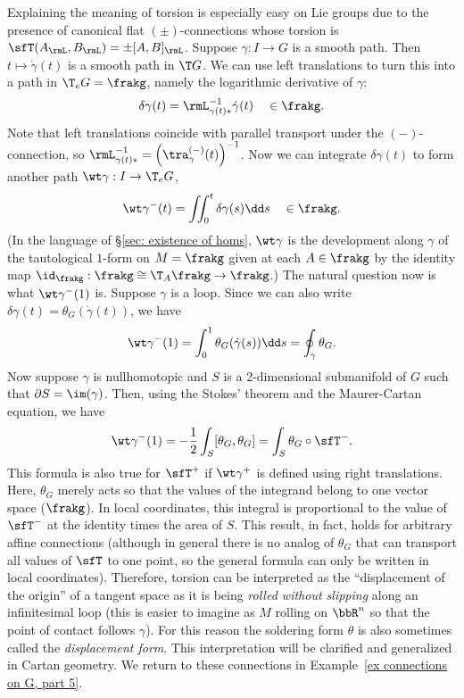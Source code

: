 \begin{example}
    Explaining the meaning of torsion is especially easy on Lie groups due to the presence of canonical flat $(\pm)$-connections whose torsion is $\sfT(A_\rmL,B_\rmL)=\pm [A,B]_\rmL$. Suppose $\gamma:I\to G$ is a smooth path. Then $t\mapsto \dot\gamma(t)$ is a smooth path in $\T G$. We can use left translations to turn this into a path in $\T_e G=\frakg$, namely the logarithmic derivative of $\gamma$:
    \[\delta \gamma(t)=\rmL_{\gamma(t)\ast}^{-1}\dot\gamma(t)\quad \in \frakg.\]
    Note that left translations coincide with parallel transport under the $(-)$-connection, so $\rmL_{\gamma(t)\ast}^{-1}=\left(\tra^{(-)}_{\gamma}(t)\right)^{-1}$. Now we can integrate $\delta\gamma(t)$ to form another path $\wt\gamma:I\to \T_e G$,
    \[\wt\gamma^-(t)=\iint_0^t \delta\gamma(s)\dd s \quad \in \frakg.\]
    (In the language of \S\ref{sec: existence of homs}, $\wt\gamma$ is the development along $\gamma$ of the tautological $1$-form on $M=\frakg$ given at each $A\in\frakg$ by the identity map $\id_{\frakg}:\frakg\cong \T_A\frakg\to \frakg$.) The natural question now is what $\wt\gamma^-(1)$ is. Suppose $\gamma$ is a loop. Since we can also write $\delta\gamma(t)=\theta_G(\dot\gamma(t))$, we have
    \[\wt\gamma^-(1)=\int_0^1 \theta_G(\dot\gamma(s))\dd s=\oint_\gamma \theta_G.\]
    Now suppose $\gamma$ is nullhomotopic and $S$ is a 2-dimensional submanifold of $G$ such that $\partial S=\im(\gamma)$. Then, using the Stokes' theorem and the Maurer-Cartan equation, we have
    \[\wt\gamma^-(1)=-\frac12\int_S [\theta_G,\theta_G]=\int_S \theta_G\circ \sfT^-.\]
    This formula is also true for $\sfT^+$ if $\wt\gamma^+$ is defined using right translations. Here, $\theta_G$ merely acts so that the values of the integrand belong to one vector space ($\frakg$). In local coordinates, this integral is proportional to the value of $\sfT^-$ at the identity times the area of $S$. This result, in fact, holds for arbitrary affine connections (although in general there is no analog of $\theta_G$ that can transport all values of $\sfT$ to one point, so the general formula can only be written in local coordinates). Therefore, torsion can be interpreted as the ``displacement of the origin'' of a tangent space as it is being \emph{rolled without slipping} along an infinitesimal loop (this is easier to imagine as $M$ rolling on $\bbR^n$ so that the point of contact follows $\gamma$). For this reason the soldering form $\theta$ is also sometimes called the \emph{displacement form}. This interpretation will be clarified and generalized in Cartan geometry. We return to these connections in Example~\ref{ex connections on G, part 5}.
\end{example}







